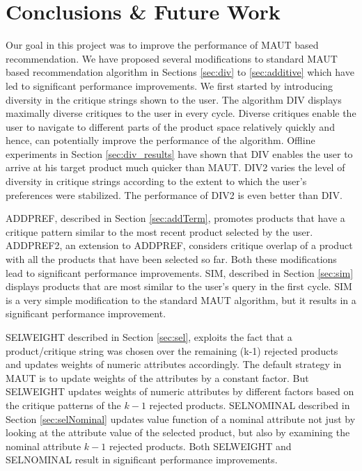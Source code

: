 \chapter{Conclusions \& Future Work}
\label{chap:conclusions}
Our goal in this project was to improve the performance of MAUT based recommendation.
We have proposed several modifications to standard MAUT based recommendation algorithm in Sections \ref{sec:div} to \ref{sec:additive} which have led to significant performance improvements.
We first started by introducing diversity in the critique strings shown to the user.
The algorithm DIV displays maximally diverse critiques to the user in every cycle. 
Diverse critiques enable the user to navigate to different parts of the product space relatively quickly and hence, can potentially improve the performance of the algorithm.
Offline experiments in Section \ref{sec:div_results} have shown that DIV enables the user to arrive at his target product much quicker than MAUT.
DIV2 varies the level of diversity in critique strings according to the extent to which the user's preferences were stabilized.
The performance of DIV2 is even better than DIV.

ADDPREF, described in Section \ref{sec:addTerm}, promotes products that have a critique pattern similar to the most recent product selected by the user.
ADDPREF2, an extension to ADDPREF, considers critique overlap of a product with all the products that have been selected so far.
Both these modifications lead to significant performance improvements.
SIM, described in Section \ref{sec:sim} displays products that are most similar to the user's query in the first cycle.
SIM is a very simple modification to the standard MAUT algorithm, but it results in a significant performance improvement.

SELWEIGHT described in Section \ref{sec:sel}, exploits the fact that a product/critique string was chosen over the remaining (k-1) rejected products and updates weights of numeric attributes accordingly. 
The default strategy in MAUT is to update weights of the attributes by a constant factor.
But SELWEIGHT updates weights of numeric attributes by different factors based on the critique patterns of the $k-1$ rejected products.
SELNOMINAL described in Section \ref{sec:selNominal} updates value function of a nominal attribute not just by looking at the attribute value of the selected product, but also by examining the nominal attribute $k-1$ rejected products.
Both SELWEIGHT and SELNOMINAL result in significant performance improvements.

